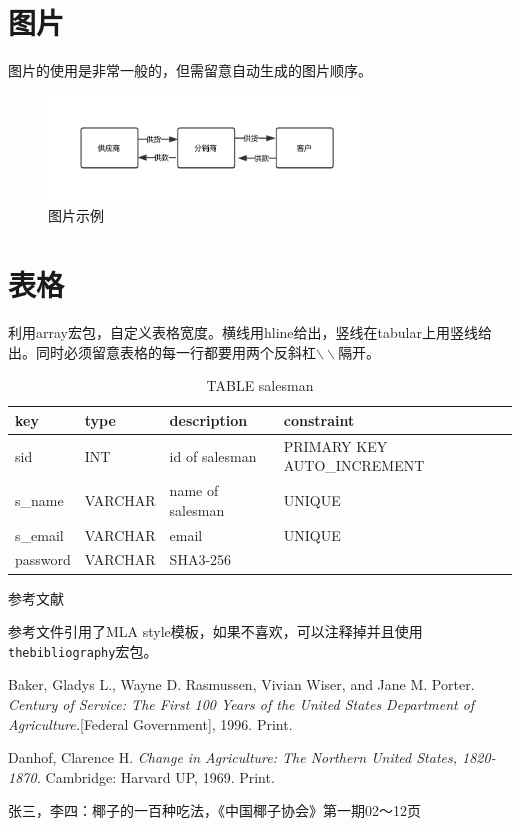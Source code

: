\documentclass[10.5pt,a4paper,headings]{ctexart}
\newcommand{\bibent}{\noindent \hangindent 40pt}
\newenvironment{workscited}{\newpage \begin{center} 参考文献 \end{center}}{\newpage }
\begin{document}
\section{图片}
图片的使用是非常一般的，但需留意自动生成的图片顺序。
\begin{figure}[htbp]
    \centering
    \includegraphics[page=1,width=0.75\textwidth]{f1.pdf}
    \caption{图片示例}
\end{figure}

\section{表格}
利用array宏包，自定义表格宽度。横线用hline给出，竖线在tabular上用竖线给出。同时必须留意表格的每一行都要用两个反斜杠$\backslash\backslash$隔开。

\begin{table}
    \centering
    \begin{tabular}{ | p{1.5cm}<{\centering} | p{2cm}<{\centering} | p{3cm}<{\centering} | p{5cm}<{\centering} |}
        \hline
        key         & type      & description       & constraint \\ 
        \hline
        sid         & INT       & id of salesman    & PRIMARY KEY AUTO\_INCREMENT  \\ 
        \hline 
        s\_name      & VARCHAR   & name of salesman  & UNIQUE  \\ 
        \hline 
        s\_email     & VARCHAR   & email             & UNIQUE \\
        \hline
        password    & VARCHAR   & SHA3-256          & \\
        \hline
    \end{tabular}
    \caption{TABLE salesman}
\end{table}

\begin{workscited}

    \bibent
    参考文件引用了MLA style模板，如果不喜欢，可以注释掉并且使用\texttt{thebibliography}宏包。
    
    \bibent
    Baker, Gladys L., Wayne D. Rasmussen, Vivian Wiser, and Jane M. Porter. \textit{Century of Service: The First 100 Years of the United States Department of Agriculture.}[Federal Government], 1996. Print.
    
    \bibent
    Danhof, Clarence H. \textit{Change in Agriculture: The Northern United States, 1820-1870.} Cambridge: Harvard UP, 1969. Print.
    
    \bibent
    张三，李四：椰子的一百种吃法，《中国椰子协会》第一期02～12页
    
\end{workscited}
\end{document}
